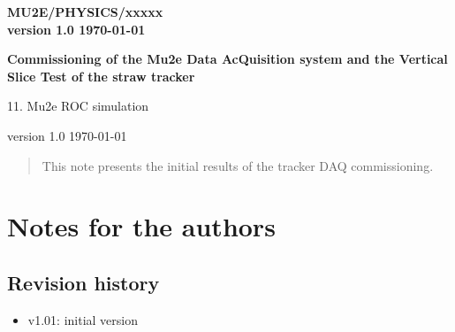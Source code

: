 \documentclass[12pt]{article}
\begin{document}
\begin{titlepage}
  \begin{flushright}
    \bf {MU2E/PHYSICS/xxxxx} \\
    version 1.0
    \today
 \end{flushright}

  \vspace{1cm}

  \begin{center}
    {\Large \bf Commissioning of the Mu2e Data AcQuisition system and the Vertical Slice Test of the straw tracker

      \vspace{0.3in}

      11. Mu2e ROC simulation
    }

    \vspace{1cm}

   
    version 1.0
    \today
 \end{center}

  \begin{abstract}
    This note presents the initial results of the tracker DAQ commissioning.
    \vspace{0.2in}
  \end{abstract}

\end{titlepage}
%
%
%
{\tableofcontents}

% 

\newpage
\section {Notes for the authors}
\subsection {Revision history} 
\begin{itemize}
\item
  v1.01: initial version
\end{itemize}
\end{document}
